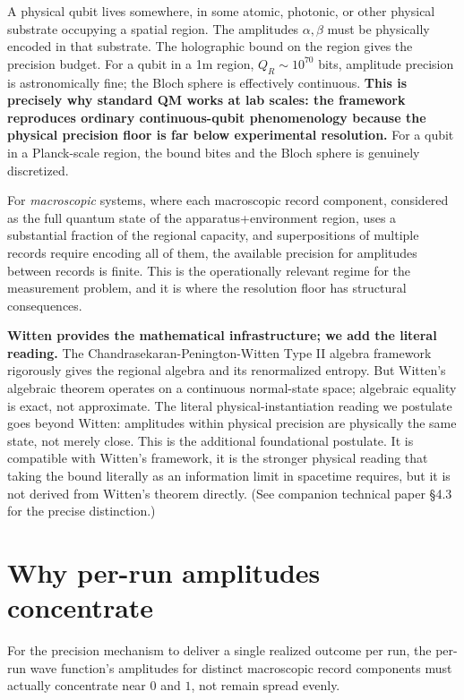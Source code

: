 \documentclass[11pt,a4paper]{article}
\begin{document}
A physical qubit lives somewhere, in some atomic, photonic, or other physical substrate occupying a spatial region. The amplitudes $\alpha, \beta$ must be physically encoded in that substrate. The holographic bound on the region gives the precision budget. For a qubit in a 1m region, $Q_R \sim 10^{70}$ bits, amplitude precision is astronomically fine; the Bloch sphere is effectively continuous. \textbf{This is precisely why standard QM works at lab scales: the framework reproduces ordinary continuous-qubit phenomenology because the physical precision floor is far below experimental resolution.} For a qubit in a Planck-scale region, the bound bites and the Bloch sphere is genuinely discretized.

For \emph{macroscopic} systems, where each macroscopic record component, considered as the full quantum state of the apparatus+environment region, uses a substantial fraction of the regional capacity, and superpositions of multiple records require encoding all of them, the available precision for amplitudes between records is finite. This is the operationally relevant regime for the measurement problem, and it is where the resolution floor has structural consequences.

\textbf{Witten provides the mathematical infrastructure; we add the literal reading.} The Chandrasekaran-Penington-Witten Type II algebra framework rigorously gives the regional algebra and its renormalized entropy. But Witten's algebraic theorem operates on a continuous normal-state space; algebraic equality is exact, not approximate. The literal physical-instantiation reading we postulate goes beyond Witten: amplitudes within physical precision are physically the same state, not merely close. This is the additional foundational postulate. It is compatible with Witten's framework, it is the stronger physical reading that taking the bound literally as an information limit in spacetime requires, but it is not derived from Witten's theorem directly. (See companion technical paper §4.3 for the precise distinction.)

\section{Why per-run amplitudes concentrate}

For the precision mechanism to deliver a single realized outcome per run, the per-run wave function's amplitudes for distinct macroscopic record components must actually concentrate near $0$ and $1$, not remain spread evenly.
\end{document}
